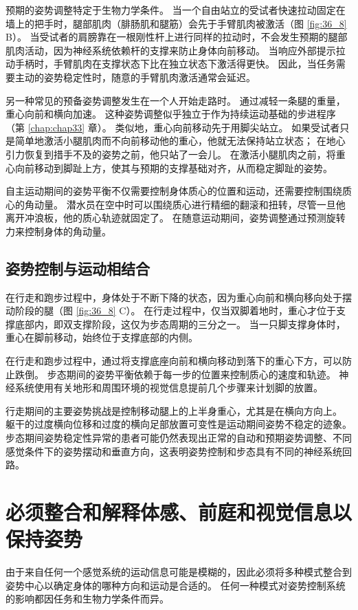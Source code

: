 预期的姿势调整特定于生物力学条件。 当一个自由站立的受试者快速拉动固定在墙上的把手时，腿部肌肉（腓肠肌和腿筋）会先于手臂肌肉被激活（图 \ref{fig:36_8} B）。 当受试者的肩膀靠在一根刚性杆上进行同样的拉动时，不会发生预期的腿部肌肉活动，因为神经系统依赖杆的支撑来防止身体向前移动。 当响应外部提示拉动手柄时，手臂肌肉在支撑状态下比在独立状态下激活得更快。 因此，当任务需要主动的姿势稳定性时，随意的手臂肌肉激活通常会延迟。

另一种常见的预备姿势调整发生在一个人开始走路时。 通过减轻一条腿的重量，重心向前和横向加速。 这种姿势调整似乎独立于作为持续运动基础的步进程序（第 \ref{chap:chap33} 章）。 类似地，重心向前移动先于用脚尖站立。 如果受试者只是简单地激活小腿肌肉而不向前移动他的重心，他就无法保持站立状态； 在地心引力恢复到措手不及的姿势之前，他只站了一会儿。 在激活小腿肌肉之前，将重心向前移动到脚趾上方，使其与预期的支撑基础对齐，从而稳定脚趾的姿势。

自主运动期间的姿势平衡不仅需要控制身体质心的位置和运动，还需要控制围绕质心的角动量。 潜水员在空中时可以围绕质心进行精细的翻滚和扭转，尽管一旦他离开冲浪板，他的质心轨迹就固定了。 在随意运动期间，姿势调整通过预测旋转力来控制身体的角动量。

\subsection{姿势控制与运动相结合}
在行走和跑步过程中，身体处于不断下降的状态，因为重心向前和横向移向处于摆动阶段的腿（图 \ref{fig:36_8} C）。 在行走过程中，仅当双脚着地时，重心才位于支撑底部内，即双支撑阶段，这仅为步态周期的三分之一。 当一只脚支撑身体时，重心在脚前移动，始终位于支撑底部的内侧。

在行走和跑步过程中，通过将支撑底座向前和横向移动到落下的重心下方，可以防止跌倒。 步态期间的姿势平衡依赖于每一步的位置来控制质心的速度和轨迹。 神经系统使用有关地形和周围环境的视觉信息提前几个步骤来计划脚的放置。

行走期间的主要姿势挑战是控制移动腿上的上半身重心，尤其是在横向方向上。 躯干的过度横向位移和过度的横向足部放置可变性是运动期间姿势不稳定的迹象。 步态期间姿势稳定性异常的患者可能仍然表现出正常的自动和预期姿势调整、不同感觉条件下的姿势摆动和垂直方向，这表明姿势控制和步态具有不同的神经系统回路。


\section{必须整合和解释体感、前庭和视觉信息以保持姿势}
由于来自任何一个感觉系统的运动信息可能是模糊的，因此必须将多种模式整合到姿势中心以确定身体的哪种方向和运动是合适的。 任何一种模式对姿势控制系统的影响都因任务和生物力学条件而异。

